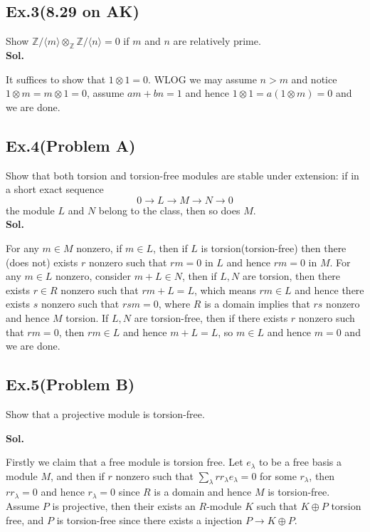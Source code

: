 \documentclass[lang=en,11pt,a4paper,citestyle =authoryear]{elegantpaper}
\begin{document}
\subsection*{Ex.3(8.29 on AK)} 
Show $\mathbb{Z}/\langle m\rangle\otimes_{\mathbb{Z}}\mathbb{Z}/\langle n\rangle = 0$ if $m$ and $n$ are relatively prime.
\vspace{0.5em}\\
\textbf{Sol.} \par
It suffices to show that $1\otimes 1 = 0$. WLOG we may assume $n>m$ and notice $1 \otimes m = m\otimes 1 = 0$, assume $am+bn = 1$ and hence $1\otimes 1 = a(1\otimes m) = 0$ and we are done.
\par 
\vspace{0.5em}

\subsection*{Ex.4(Problem A)} 
Show that both torsion and torsion-free modules are stable under extension: if in a short exact sequence
\[0\to L\to M \to N \to 0\]
the module $L$ and $N$ belong to the class, then so does $M$.
\vspace{0.5em}\\
\textbf{Sol.} \par
For any $m\in M$ nonzero, if $m\in L$, then if $L$ is torsion(torsion-free) then there (does not) exists $r$ nonzero such that $rm = 0$ in $L$ and hence $rm = 0$ in $M$. For any $m\in L$ nonzero, consider $m+L \in N$, then if $L,N$ are torsion, then there exists $r\in R$ nonzero such that $rm+L = L$, which means $rm \in L$ and hence there exists $s$ nonzero such that $rsm = 0$, where $R$ is a domain implies that $rs$ nonzero and hence $M$ torsion. If $L,N$ are torsion-free, then if there exists $r$ nonzero such that $rm = 0$, then $rm \in L$ and hence $m+L = L$, so $m \in L$ and hence $m = 0$ and we are done.
\par 
\vspace{0.5em}

\subsection*{Ex.5(Problem B)} 
Show that a projective module is torsion-free.
\vspace{0.5em}\par
\textbf{Sol.} \par
Firstly we claim that a free module is torsion free. Let $e_\lambda$ to be a free basis a module $M$, and then if $r$ nonzero such that $\sum\limits_{\lambda} rr_{\lambda}e_{\lambda} = 0$ for some $r_{\lambda}$, then $rr_{\lambda} = 0$ and hence $r_{\lambda} = 0$ since $R$ is a domain and hence $M$ is torsion-free. Assume $P$ is projective, then their exists an $R$-module $K$ such that $K\oplus P$ torsion free, and $P$ is torsion-free since there exists a injection $P\to K\oplus P$.
\par 
\vspace{0.5em}
\end{document}
